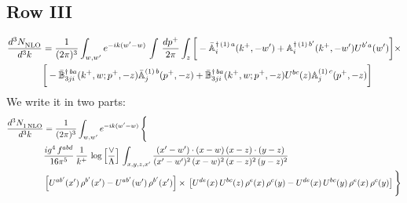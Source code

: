 \documentclass[9pt]{article}
\def\mf#1{\mathbb{#1}}
\numberwithin{equation}{section}
\begin{document}
\subsection{Row III}
\begin{align}
\frac{d^{3}N_{\rm NLO}^{\rm}}{d^{3}k}  & = \frac{1}{(2\pi)^{3}}  \int_{w, w^\prime} e^{-ik(w^\prime-w)}\, \int\,\frac{dp^{+}}{2\pi} \int_{z} \bigg[-\bar{\mf{A}}^{\dagger\,(1)\,a}_{i}(k^{+},-w^{\prime})+\mf{A}^{\dagger\, (1)\, b^{\prime}}_{i}(k^{+},-w^{\prime})U^{b^{\prime}a}(w^{\prime})\bigg]\times \notag \\ &  \bigg[-\Bar{\mf{B}}^{\dagger\, ba}_{3ji}(k^{+}, w; p^{+}, -z)\Bar{\mf{A}}^{(1)\,b}_{j}(p^{+}, - z)+ \Bar{\mf{B}}^{\dagger\, ba}_{3ji}(k^{+},w; p^{+},-z) U^{bc}(z) \mf{A}^{(1)\, c}_{j}(p^{+},- z)\bigg]\nonumber
\end{align}
We write it in two parts: 
\begin{align}
   \frac{d^{3}N_{1\,\rm NLO}^{\rm}}{d^{3}k}  & = \frac{1}{(2\pi)^{3}}  \int_{w, w^\prime} e^{-ik(w^\prime-w)}\, \Bigg\{\notag \\ & \frac{ig^{4}\,f^{abd}}{16\pi^{5}}\,\frac{1}{k^{+}}\,\log{\left[\frac{\vee}{\Lambda}\right]}\,\int_{x,y,z,x'} \frac{(x'-w')\cdot (x-w)\, (x-z)\cdot (y-z)}{(x'-w')^{2}\, (x-w)^{2}\, (x-z)^{2}\, (y-z)^{2}}\, \notag \\ & \left[U^{ab'}(x')\,\rho^{b'}(x')-U^{ab'}(w')\, \rho^{b'}(x')\right]\times\, \left[U^{de}(x)\,U^{bc}(z)\, \rho^{e}(x)\,\rho^{c}(y)-U^{de}(x)\,U^{bc}(y)\,\rho^{e}(x)\,\rho^{c}(y)\right]\Bigg\}
\end{align}
\end{document}
